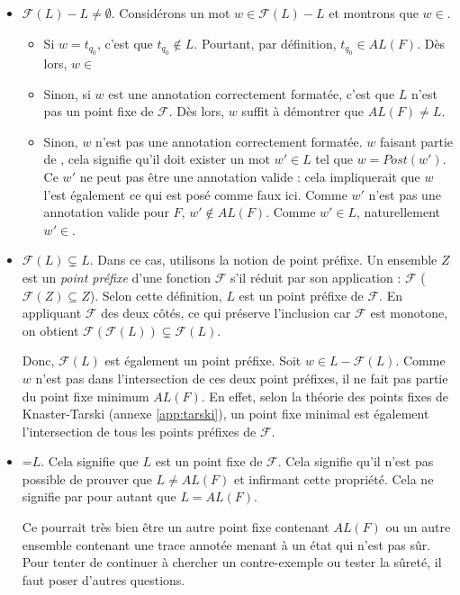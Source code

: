 \begin{itemize}
  \item $\mathcal{F}(L)-L\neq\emptyset$. Considérons un mot $w\in\mathcal{F}(L)-L$ et montrons que $w\in$\alfx.
  \begin{itemize}
    \item Si $w=t_{q_0}$, c'est que $t_{q_0}\notin L$. Pourtant, par définition, $t_{q_0}\in AL(F)$. Dès lors, $w\in$\alfx
    \item Sinon, si $w$ est une annotation correctement formatée, c'est que $L$ n'est pas un point fixe de $\mathcal{F}$. Dès lors, $w$ suffit à démontrer que $AL(F)\neq L$.
    \item Sinon, $w$ n'est pas une annotation correctement formatée. $w$ faisant partie de \fl, cela signifie qu'il doit exister un mot $w'\in L$ tel que $w=Post(w')$. Ce $w'$ ne peut pas être une annotation valide : cela impliquerait que $w$ l'est également ce qui est posé comme faux ici. Comme $w'$ n'est pas une annotation valide pour $F$, $w'\notin AL(F)$. Comme $w'\in L$, naturellement $w'\in$\alfx.
  \end{itemize}
  \item $\mathcal{F}(L)\subsetneq L$. Dans ce cas, utilisons la notion de point préfixe. Un ensemble $Z$ est un \emph{point préfixe} d'une fonction $\mathcal{F}$ s'il réduit par son application : $\mathcal{F}$ ($\mathcal{F}(Z)\subseteq Z$). Selon cette définition, $L$ est un point préfixe de $\mathcal{F}$.
  En appliquant $\mathcal{F}$ des deux côtés, ce qui préserve l'inclusion car $\mathcal{F}$ est monotone, on obtient $\mathcal{F}(\mathcal{F}(L))\subsetneq\mathcal{F}(L)$.

  Donc, $\mathcal{F}(L)$ est également un point préfixe. Soit $w\in L-\mathcal{F}(L)$. Comme $w$ n'est pas dans l'intersection de ces deux point préfixes, il ne fait pas partie du point fixe minimum $AL(F)$. En effet, selon la théorie des points fixes de Knaster-Tarski (annexe \ref{app:tarski}), un point fixe minimal est également l'intersection de tous les points préfixes de $\mathcal{F}$.

  \item \fl=$L$. Cela signifie que $L$ est un point fixe de $\mathcal{F}$. Cela signifie qu'il n'est pas possible de prouver que $L\neq AL(F)$ et infirmant cette propriété. Cela ne signifie par pour autant que $L=AL(F)$.

  Ce pourrait très bien être un autre point fixe contenant $AL(F)$ ou un autre ensemble contenant une trace annotée menant à un état qui n'est pas sûr. Pour tenter de continuer à chercher un contre-exemple ou tester la sûreté, il faut poser d'autres questions.

\end{itemize}




